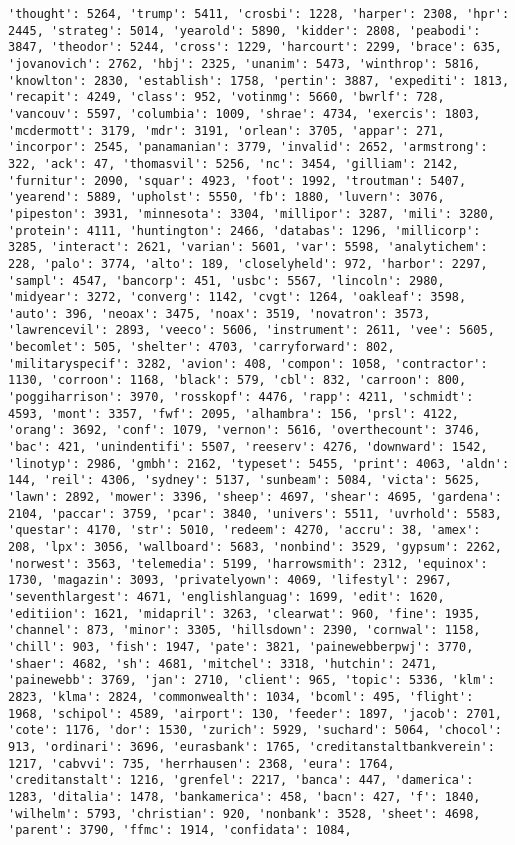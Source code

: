 \documentclass[11pt]{article}
\begin{document}
\begin{Verbatim}[commandchars=\\\{\}]
'thought': 5264, 'trump': 5411, 'crosbi': 1228, 'harper': 2308, 'hpr': 2445, 'strateg': 5014, 'yearold': 5890, 'kidder': 2808, 'peabodi': 3847, 'theodor': 5244, 'cross': 1229, 'harcourt': 2299, 'brace': 635, 'jovanovich': 2762, 'hbj': 2325, 'unanim': 5473, 'winthrop': 5816, 'knowlton': 2830, 'establish': 1758, 'pertin': 3887, 'expediti': 1813, 'recapit': 4249, 'class': 952, 'votinmg': 5660, 'bwrlf': 728, 'vancouv': 5597, 'columbia': 1009, 'shrae': 4734, 'exercis': 1803, 'mcdermott': 3179, 'mdr': 3191, 'orlean': 3705, 'appar': 271, 'incorpor': 2545, 'panamanian': 3779, 'invalid': 2652, 'armstrong': 322, 'ack': 47, 'thomasvil': 5256, 'nc': 3454, 'gilliam': 2142, 'furnitur': 2090, 'squar': 4923, 'foot': 1992, 'troutman': 5407, 'yearend': 5889, 'upholst': 5550, 'fb': 1880, 'luvern': 3076, 'pipeston': 3931, 'minnesota': 3304, 'millipor': 3287, 'mili': 3280, 'protein': 4111, 'huntington': 2466, 'databas': 1296, 'millicorp': 3285, 'interact': 2621, 'varian': 5601, 'var': 5598, 'analytichem': 228, 'palo': 3774, 'alto': 189, 'closelyheld': 972, 'harbor': 2297, 'sampl': 4547, 'bancorp': 451, 'usbc': 5567, 'lincoln': 2980, 'midyear': 3272, 'converg': 1142, 'cvgt': 1264, 'oakleaf': 3598, 'auto': 396, 'neoax': 3475, 'noax': 3519, 'novatron': 3573, 'lawrencevil': 2893, 'veeco': 5606, 'instrument': 2611, 'vee': 5605, 'becomlet': 505, 'shelter': 4703, 'carryforward': 802, 'militaryspecif': 3282, 'avion': 408, 'compon': 1058, 'contractor': 1130, 'corroon': 1168, 'black': 579, 'cbl': 832, 'carroon': 800, 'poggiharrison': 3970, 'rosskopf': 4476, 'rapp': 4211, 'schmidt': 4593, 'mont': 3357, 'fwf': 2095, 'alhambra': 156, 'prsl': 4122, 'orang': 3692, 'conf': 1079, 'vernon': 5616, 'overthecount': 3746, 'bac': 421, 'unindentifi': 5507, 'reeserv': 4276, 'downward': 1542, 'linotyp': 2986, 'gmbh': 2162, 'typeset': 5455, 'print': 4063, 'aldn': 144, 'reil': 4306, 'sydney': 5137, 'sunbeam': 5084, 'victa': 5625, 'lawn': 2892, 'mower': 3396, 'sheep': 4697, 'shear': 4695, 'gardena': 2104, 'paccar': 3759, 'pcar': 3840, 'univers': 5511, 'uvrhold': 5583, 'questar': 4170, 'str': 5010, 'redeem': 4270, 'accru': 38, 'amex': 208, 'lpx': 3056, 'wallboard': 5683, 'nonbind': 3529, 'gypsum': 2262, 'norwest': 3563, 'telemedia': 5199, 'harrowsmith': 2312, 'equinox': 1730, 'magazin': 3093, 'privatelyown': 4069, 'lifestyl': 2967, 'seventhlargest': 4671, 'englishlanguag': 1699, 'edit': 1620, 'editiion': 1621, 'midapril': 3263, 'clearwat': 960, 'fine': 1935, 'channel': 873, 'minor': 3305, 'hillsdown': 2390, 'cornwal': 1158, 'chill': 903, 'fish': 1947, 'pate': 3821, 'painewebberpwj': 3770, 'shaer': 4682, 'sh': 4681, 'mitchel': 3318, 'hutchin': 2471, 'painewebb': 3769, 'jan': 2710, 'client': 965, 'topic': 5336, 'klm': 2823, 'klma': 2824, 'commonwealth': 1034, 'bcoml': 495, 'flight': 1968, 'schipol': 4589, 'airport': 130, 'feeder': 1897, 'jacob': 2701, 'cote': 1176, 'dor': 1530, 'zurich': 5929, 'suchard': 5064, 'chocol': 913, 'ordinari': 3696, 'eurasbank': 1765, 'creditanstaltbankverein': 1217, 'cabvvi': 735, 'herrhausen': 2368, 'eura': 1764, 'creditanstalt': 1216, 'grenfel': 2217, 'banca': 447, 'damerica': 1283, 'ditalia': 1478, 'bankamerica': 458, 'bacn': 427, 'f': 1840, 'wilhelm': 5793, 'christian': 920, 'nonbank': 3528, 'sheet': 4698, 'parent': 3790, 'ffmc': 1914, 'confidata': 1084, 
\end{Verbatim}
\end{document}
